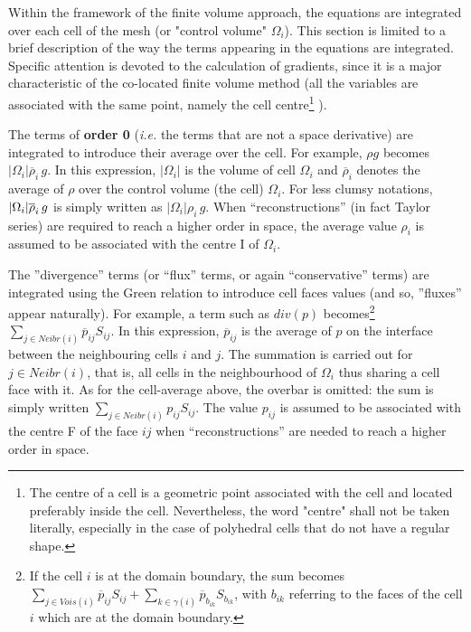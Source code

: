 
Within the framework of the finite volume approach, the equations are
integrated over each cell of the mesh (or "control volume" $\Omega_i$). This
section is limited to a brief description of the way the terms appearing in
the equations are integrated. Specific attention is devoted to the
calculation of gradients, since it is a major characteristic of the
co-located finite volume method (all the variables are associated with the
same point, namely the cell centre\footnote{%
The centre of a cell is a geometric point associated with the cell and
located preferably inside the cell. Nevertheless, the word "centre" shall
not be taken literally,
especially in the case of polyhedral cells that do not have a regular shape.}%
).

The terms of \textbf{order 0} (\textit{i.e.} the terms that are not a space
derivative) are integrated to introduce their average over the cell. For
example, $\rho g$ becomes $|\Omega _{i}|\overline{\rho }_{i}\,g$. In this
expression, $|\Omega _{i}|$ is the volume of cell $\Omega _{i}$ and $%
\overline{\rho }_{i}$ denotes the average of $\rho $ over the control volume
(the cell) $\Omega _{i}$. For less clumsy notations, $|\Omega _{i}|\overline{%
\rho }_{i}\,g$ is simply written as $|\Omega _{i}|\rho _{i}\,g$. When
``reconstructions'' (in fact Taylor series) are required to reach a higher
order in space, the average value $\rho _{i}$ is assumed to be associated
with the centre I of $\Omega _{i}$.

The ''divergence'' terms (or ``flux'' terms, or again ``conservative''
terms) are integrated using the Green relation to introduce cell faces
values (and so, ''fluxes'' appear naturally). For example, a term such as $%
div(p)$ becomes\footnote{%
If the cell $i$ is at the domain boundary, the sum becomes $%
\sum\limits_{j\in Vois(i)}\overline{p}_{ij}S_{ij}+\sum\limits_{k\in \gamma
(i)}\overline{p}_{b_{ik}}S_{b_{ik}}$, with $b_{ik}$ referring to the faces
of the cell $i$ which are at the domain boundary.} $\sum\limits_{j\in
Neibr(i)}\overline{p}_{ij}S_{ij}$. In this expression, $\overline{p}_{ij}$
is the average of $p$ on the interface between the neighbouring cells $i$
and $j$. The summation is carried out for $j\in Neibr(i)$, that is, all
cells in the neighbourhood of $\Omega _{i}$ thus sharing a cell face with
it. As for the cell-average above, the overbar is omitted: the sum is simply
written $\sum\limits_{j\in Neibr(i)}p_{ij}S_{ij}$. The value $p_{ij}$ is
assumed to be associated with the centre F of the face $ij$ when
``reconstructions'' are needed to reach a higher order in space.

